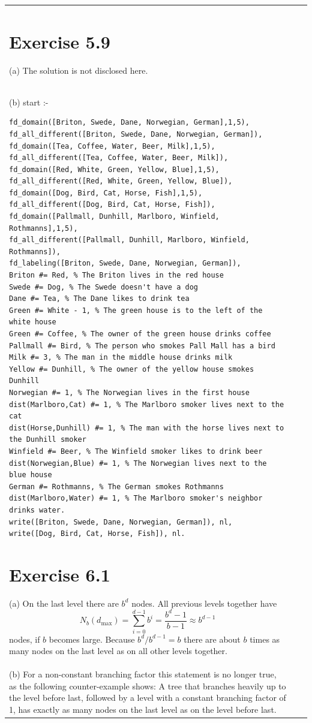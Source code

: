 \documentclass[10pt]{book}
\begin{document}
\begin{center}
\begin{tabular}{|l|l|l|}
\section{Exercise 5.9}
(a) The solution is not disclosed here.\\
(b) start :-
\begin{verbatim}
fd_domain([Briton, Swede, Dane, Norwegian, German],1,5),
fd_all_different([Briton, Swede, Dane, Norwegian, German]),
fd_domain([Tea, Coffee, Water, Beer, Milk],1,5),
fd_all_different([Tea, Coffee, Water, Beer, Milk]),
fd_domain([Red, White, Green, Yellow, Blue],1,5),
fd_all_different([Red, White, Green, Yellow, Blue]),
fd_domain([Dog, Bird, Cat, Horse, Fish],1,5),
fd_all_different([Dog, Bird, Cat, Horse, Fish]),
fd_domain([Pallmall, Dunhill, Marlboro, Winfield, Rothmanns],1,5),
fd_all_different([Pallmall, Dunhill, Marlboro, Winfield, Rothmanns]),
fd_labeling([Briton, Swede, Dane, Norwegian, German]),
Briton #= Red, % The Briton lives in the red house
Swede #= Dog, % The Swede doesn't have a dog
Dane #= Tea, % The Dane likes to drink tea
Green #= White - 1, % The green house is to the left of the white house
Green #= Coffee, % The owner of the green house drinks coffee
Pallmall #= Bird, % The person who smokes Pall Mall has a bird
Milk #= 3, % The man in the middle house drinks milk
Yellow #= Dunhill, % The owner of the yellow house smokes Dunhill
Norwegian #= 1, % The Norwegian lives in the first house
dist(Marlboro,Cat) #= 1, % The Marlboro smoker lives next to the cat
dist(Horse,Dunhill) #= 1, % The man with the horse lives next to the Dunhill smoker
Winfield #= Beer, % The Winfield smoker likes to drink beer
dist(Norwegian,Blue) #= 1, % The Norwegian lives next to the blue house
German #= Rothmanns, % The German smokes Rothmanns
dist(Marlboro,Water) #= 1, % The Marlboro smoker's neighbor drinks water.
write([Briton, Swede, Dane, Norwegian, German]), nl,
write([Dog, Bird, Cat, Horse, Fish]), nl.
\end{verbatim}

\section{Exercise 6.1}
(a) On the last level there are $b^{d}$ nodes. All previous levels together have
$$
N_{b}\left(d_{\max}\right)=\sum_{i=0}^{d-1} b^{i}=\frac{b^{d}-1}{b-1} \approx b^{d-1}
$$
nodes, if $b$ becomes large. Because $b^{d} / b^{d-1}=b$ there are about $b$ times as many nodes on the last level as on all other levels together.\\
(b) For a non-constant branching factor this statement is no longer true, as the following counter-example shows: A tree that branches heavily up to the level before last, followed by a level with a constant branching factor of 1, has exactly as many nodes on the last level as on the level before last.


\end{tabular}
\end{center}
\end{document}
